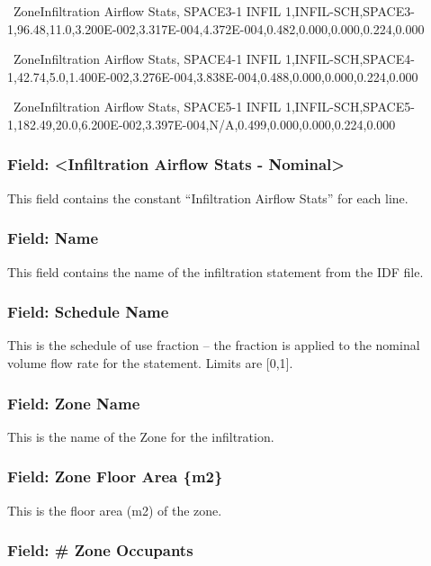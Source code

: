 ~ZoneInfiltration Airflow Stats, SPACE3-1 INFIL 1,INFIL-SCH,SPACE3-1,96.48,11.0,3.200E-002,3.317E-004,4.372E-004,0.482,0.000,0.000,0.224,0.000

~ZoneInfiltration Airflow Stats, SPACE4-1 INFIL 1,INFIL-SCH,SPACE4-1,42.74,5.0,1.400E-002,3.276E-004,3.838E-004,0.488,0.000,0.000,0.224,0.000

~ZoneInfiltration Airflow Stats, SPACE5-1 INFIL 1,INFIL-SCH,SPACE5-1,182.49,20.0,6.200E-002,3.397E-004,N/A,0.499,0.000,0.000,0.224,0.000

\subsubsection{Field: \textless{}Infiltration Airflow Stats - Nominal\textgreater{}}\label{field-infiltration-airflow-stats---nominal}

This field contains the constant ``Infiltration Airflow Stats'' for each line.

\subsubsection{Field: Name}\label{field-name-6}

This field contains the name of the infiltration statement from the IDF file.

\subsubsection{Field: Schedule Name}\label{field-schedule-name-5}

This is the schedule of use fraction -- the fraction is applied to the nominal volume flow rate for the statement. Limits are {[}0,1{]}.

\subsubsection{Field: Zone Name}\label{field-zone-name-7}

This is the name of the Zone for the infiltration.

\subsubsection{Field: Zone Floor Area \{m2\}}\label{field-zone-floor-area-m2-5}

This is the floor area (m2) of the zone.

\subsubsection{Field: \# Zone Occupants}\label{field-zone-occupants-5}

